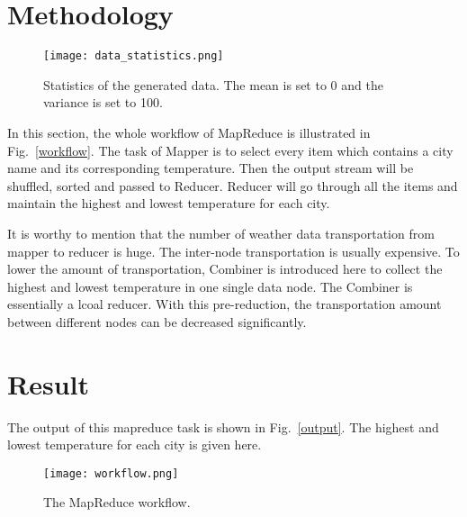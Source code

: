 \documentclass[10pt,twocolumn,letterpaper]{article}
\begin{document}
    
    \section{Methodology}

    \begin{figure}[t]
        \begin{center}
           \texttt{[image: data\_statistics.png]}
        \end{center}
           \caption{Statistics of the generated data.  The mean is set to 0 and the variance is set to 100.}
        \label{statistics}       
        \label{fig:long}
        \label{fig:onecol}
    \end{figure}
    In this section, the whole workflow of MapReduce is illustrated in Fig.~\ref{workflow}. 
    The task of Mapper is to select every item which contains a city name
    and its corresponding temperature. Then the output stream will be
    shuffled, sorted and passed to Reducer. Reducer will go through all
    the items and maintain the highest and lowest temperature for each 
    city. 

    It is worthy to mention that the number of weather data transportation  
    from mapper to reducer is huge. The inter-node transportation is usually
    expensive. To lower the amount of transportation, Combiner is introduced
    here to collect the highest and lowest temperature in one single data node.
    The Combiner is essentially a lcoal reducer. With this pre-reduction, 
    the transportation amount between different nodes can be decreased significantly.
    
    \section{Result}
    
    The output of this mapreduce task is shown in Fig.~\ref{output}. The highest
    and lowest temperature for each city is given here. 
    \begin{figure}[t]
        \begin{center}
           \texttt{[image: workflow.png]}
        \end{center}
           \caption{\label{workflow}The MapReduce workflow.}
        \label{fig:long}
        \label{fig:onecol}
    \end{figure}
\end{document}
